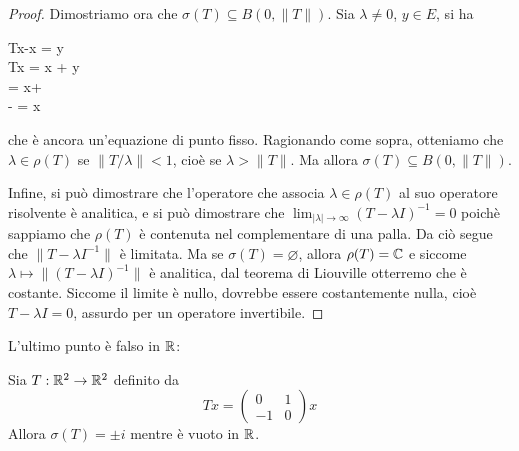 \begin{proof}
	Dimostriamo ora che $\sigma(T) \subseteq B(0, \|T\|)$.
	Sia $\lambda \neq 0$, $y \in E$, si ha
	\begin{eqalign*}
		Tx-\lambda x = y\\
		Tx = \lambda x + y\\
		\lambda = x+ \lambda\\
		\lambda - \lambda = x
	\end{eqalign*}
	che è ancora un'equazione di punto fisso. Ragionando come sopra, otteniamo che $\lambda \in \rho(T)$ se $\|T/\lambda\| < 1$, cioè se $\lambda > \|T\|$. Ma allora $\sigma(T) \subseteq B(0,\|T\|)$.

	Infine, si può dimostrare che l'operatore che associa $\lambda \in \rho(T)$ al suo operatore risolvente è analitica, e si può dimostrare che $\lim_{|\lambda| \to \infty} (T-\lambda I)^{-1} = 0$ poichè sappiamo che $\rho(T)$ è contenuta nel complementare di una palla. Da ciò segue che $\|T-\lambda I^{-1}\|$ è limitata.
	Ma se $\sigma(T) = \varnothing$, allora $\rho(T) = \mathbb{C}$ e siccome $\lambda \mapsto \|(T-\lambda I)^{-1}\|$ è analitica, dal teorema di Liouville otterremo che è costante. Siccome il limite è nullo, dovrebbe essere costantemente nulla, cioè $T-\lambda I = 0$, assurdo per un operatore invertibile.
\end{proof}

L'ultimo punto è falso in $\mathbb{R}$:

\begin{remark}
	Sia $T:\mathbb{R}^2 \to \mathbb{R}^2$ definito da
	\begin{equation*}
		Tx  = \begin{pmatrix}
			0 & 1\\
			-1 & 0
		\end{pmatrix}x
	\end{equation*}
	Allora $\sigma(T) = \pm i$ mentre è vuoto in $\mathbb{R}$.
\end{remark}

